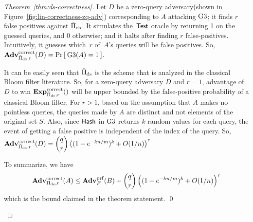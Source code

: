 \begin{proof}[Theorem~\ref{thm:ds-correctness}]
Let $D$ be a zero-query adversary(shown in Figure~\ref{fig:lin-correctness-zq-adv}) corresponding to $A$ attacking $\text{G3}$; it finds $r$ false positives against $\tilde{\Pi}_{\mathrm{ds}}$. It simulates the~$\mathsf{Test}$ oracle by returning 1 on the guessed queries, and 0 otherwise; and it halts after finding $r$ false-positives. Intuitively, it  guesses which~$r$ of~$A$'s queries will be false positives.  So, $\mathrm{\mathbf{Adv}}^{\mathrm{correct}}_{\tilde{\Pi}_{\mathrm{ds}},r}(D) = \Pr\left[\: \text{G3}(A) = 1 \:\right]$.

It can be easily seen that  $\tilde{\Pi}_{\mathrm{ds}}$ is the scheme that is analyzed in the classical Bloom filter literature. So, for a zero-query adversary $D$ and $r=1$, advantage of $D$ to win $\ExpCorrect{\tilde{\setprim}_{\mathrm{ds}},r}$ will be upper bounded by the false-positive probability of a classical Bloom filter. For $r > 1$, based on the assumption that $A$ makes no pointless queries, the queries made by $A$ are distinct and not elements of the original set $S$. Also, since $\mathsf{Hash}$ in $\text{G3}$ returns $k$ random values for each query, the event of getting a false positive is independent of the index of the query. So, $\mathrm{\mathbf{Adv}}^{\mathrm{correct}}_{\tilde{\Pi}_{\mathrm{ds}},r}(D) =   {\dbinom{q}{r}} \left( (1-e^{-kn/m})^k + O(1/n) \right)^r$

\noindent
To summarize, we have
\[
\mathrm{\mathbf{Adv}}^{\mathrm{correct}}_{\Pi_{\mathrm{ds}},r}(A) \leq  \mathbf{Adv}^{\mathrm{prf}}_{F}(B)  + {\dbinom{q}{r}} \left( (1-e^{-kn/m})^k + O(1/n) \right)^r
\]
which is the bound claimed in the theorem statement. \hfill \qed

\begin{figure}[tp]
\end{figure}
\end{proof}
